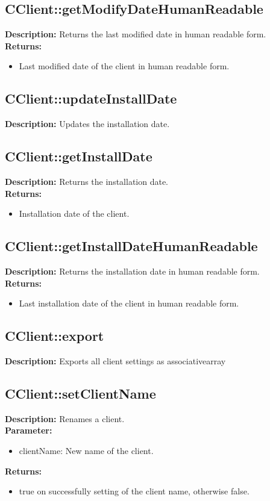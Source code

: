 \subsection{CClient::getModifyDateHumanReadable}
\textbf{Description:} Returns the last modified date in human readable form.\\
\textbf{Returns:}
\begin{itemize}
\item Last modified date of the client in human readable form.
\end{itemize}

\subsection{CClient::updateInstallDate}
\textbf{Description:} Updates the installation date.\\

\subsection{CClient::getInstallDate}
\textbf{Description:} Returns the installation date.\\
\textbf{Returns:}
\begin{itemize}
\item Installation date of the client.
\end{itemize}

\subsection{CClient::getInstallDateHumanReadable}
\textbf{Description:} Returns the installation date in human readable form.\\
\textbf{Returns:}
\begin{itemize}
\item Last installation date of the client in human readable form.
\end{itemize}

\subsection{CClient::export}
\textbf{Description:} Exports all client settings as associativearray\\

\subsection{CClient::setClientName}
\textbf{Description:} Renames a client.\\
\textbf{Parameter:}
\begin{itemize}
\item clientName: New name of the client.
\end{itemize}
\textbf{Returns:}
\begin{itemize}
\item true on successfully setting of the client name, otherwise false.
\end{itemize}

